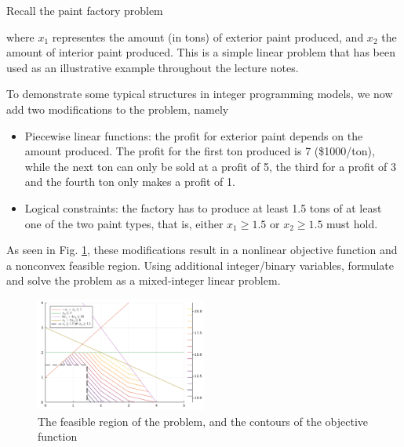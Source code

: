 Recall the paint factory problem 
%
%
where $x_1$ representes the amount (in tons) of exterior paint produced, and $x_2$ the amount of interior paint produced. This is a simple linear problem that has been used as an illustrative example throughout the lecture notes. 

To demonstrate some typical structures in integer programming models, we now add two modifications to the problem, namely
%
\begin{itemize}
    \item Piecewise linear functions: the profit for exterior paint depends on the amount produced. The profit for the first ton produced is 7 (\$1000/ton), while the next ton can only be sold at a profit of 5, the third for a profit of 3 and the fourth ton only makes a profit of 1. 
    \item Logical constraints: the factory has to produce at least 1.5 tons of at least one of the two paint types, that is, either $x_1 \ge 1.5$ or $x_2 \ge 1.5$ must hold.
\end{itemize}

As seen in Fig. \ref{p1c8:fig:E86-plot}, these modifications result in a nonlinear objective function and a nonconvex feasible region. Using additional integer/binary variables, formulate and solve the problem as a mixed-integer linear problem.

\begin{figure}[h]
	\centering
	\includegraphics[width=0.5\textwidth]{part_1/chapter_8/figures/E86-plot.pdf}
	\caption{The feasible region of the problem, and the contours of the objective function} 
    \label{p1c8:fig:E86-plot}
\end{figure}